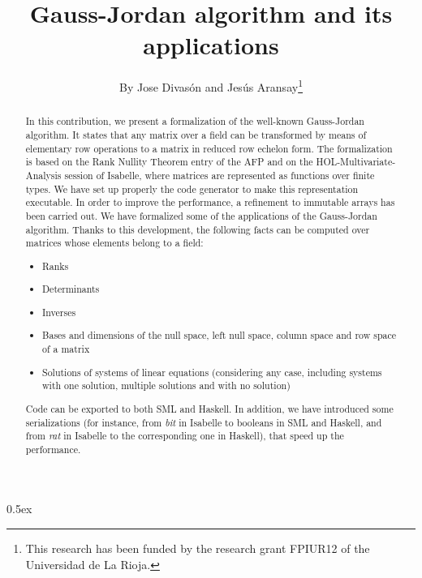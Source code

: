\documentclass[11pt,a4paper]{article}
\begin{document}
\title{Gauss-Jordan algorithm and its applications}
\author{By Jose Divas\'on and Jes\'us Aransay\thanks{This research has been funded by 
  the research grant FPIUR12 of the Universidad de La Rioja.}}
\maketitle


\begin{abstract}
In this contribution, we present a formalization of the well-known Gauss-Jordan algorithm.
It states that any matrix over a field can be transformed by means of elementary row operations to a
matrix in reduced row echelon form. The formalization is based on the
Rank Nullity Theorem entry of the AFP and on the HOL-Multivariate-Analysis session of Isabelle, 
where matrices are represented as functions over finite types. We have set up properly 
the code generator to make this representation executable. In order to improve the 
performance, a refinement to immutable arrays has been carried out. We have formalized some of the applications
of the Gauss-Jordan algorithm. Thanks to this development, the 
following facts can be computed over matrices whose elements belong to a field:

\begin{itemize}
 \item Ranks
 \item Determinants
 \item Inverses
 \item Bases and dimensions of the null space, left null space, column space and row space of a matrix
 \item Solutions of systems of linear equations (considering any case, 
   including systems with one solution, multiple solutions and with no solution)
\end{itemize}

Code can be exported to both SML and Haskell. In addition, we have introduced some serializations 
(for instance, from \emph{bit} in Isabelle to booleans in SML and Haskell, 
and from \emph{rat} in Isabelle to the corresponding one in Haskell), that speed up the performance.

\end{abstract}

\tableofcontents

\parindent 0pt\parskip 0.5ex





\end{document}
